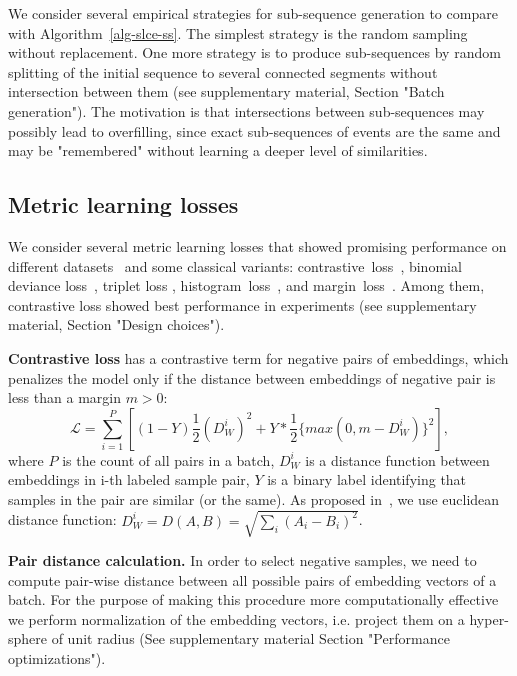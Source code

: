 \documentclass{article}
\begin{document}
We consider several empirical strategies for sub-sequence generation to compare with Algorithm~\ref{alg-slce-ss}. The simplest strategy is the random sampling without replacement. 
One more strategy is to produce sub-sequences by random splitting of the initial sequence to several connected segments without intersection between them
(see supplementary material, Section "Batch generation"). The motivation is that intersections between sub-sequences may possibly lead to overfilling, since exact sub-sequences of events are the same and may be "remembered" without learning a deeper level of similarities.



\subsection{Metric learning losses} \label{sec-ml-loss}

We consider several metric learning losses that showed promising performance on different datasets~\cite{Kaya2019DeepML} and some classical variants: contrastive~loss~\cite{Hadsell2006DimensionalityRB}, binomial deviance loss~\cite{Yi2014DeepML}, triplet loss \cite{Hoffer2015DeepML}, histogram~loss~\cite{Ustinova2016LearningDE}, and margin~loss~\cite{Manmatha2017SamplingMI}. Among them, contrastive loss showed best performance in experiments (see supplementary material, Section "Design choices").

\textbf{Contrastive loss} has a contrastive term for negative pairs of embeddings, which penalizes the model only if the distance between embeddings of negative pair is less than a margin $m>0$:  
\begin{equation}
 \mathcal{L} = \sum_{i=1}^P \left[ (1-Y)\frac{1}{2}(D_W^i)^2 +Y*\frac{1}{2}\{max(0,m-D_W^i)\}^2 \right],
\end{equation}
where $P$ is the count of all pairs in a batch, $D_W^i$ is a distance function between embeddings in i-th labeled sample pair, $Y$ is a binary label identifying that samples in the pair are similar (or the same).
As proposed in~\cite{Hadsell2006DimensionalityRB}, we use euclidean distance function: $D_W^i = D(A,B) = \sqrt{\sum_i(A_i - B_i)^2}$.

\textbf{Pair distance calculation.} In order to select negative samples, we need to compute pair-wise distance between all possible pairs of embedding vectors of a batch. For the purpose of making this procedure more computationally effective we perform normalization of the embedding vectors, i.e. project them on a hyper-sphere of unit radius (See supplementary material Section "Performance optimizations").
\end{document}
